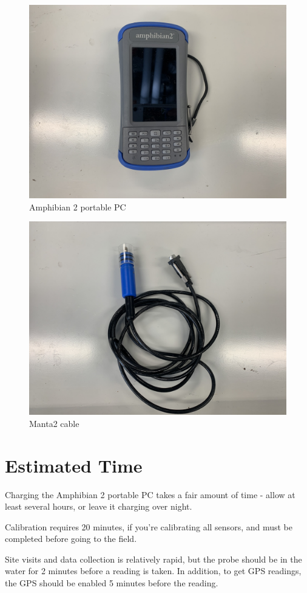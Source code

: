 \documentclass[12pt]{../SOP3}\usepackage[]{graphicx}\usepackage[]{color}
\begin{document}

\begin{figure}
\centering
\includegraphics[width=.5\textwidth]{Images/Amphibian.jpg}
\caption{Amphibian 2 portable PC}
\label{Amphibian.JPG}
\end{figure}



\begin{figure}
\centering
\includegraphics[width=.5\textwidth]{Images/MantaCord.jpg}
\caption{Manta2 cable}
\label{MantaCord.JPG}
\end{figure}


\section{Estimated Time}

\NP Charging the Amphibian 2 portable PC takes a fair amount of time - allow at least several hours, or leave it charging over night. 

\NP Calibration requires 20 minutes, if you're calibrating all sensors, and must be completed before going to the field.

\NP Site visits and data collection is relatively rapid, but the probe should be in the water for 2 minutes before a reading is taken. In addition, to get GPS readings, the GPS should be enabled 5 minutes before the reading.
\end{document}
